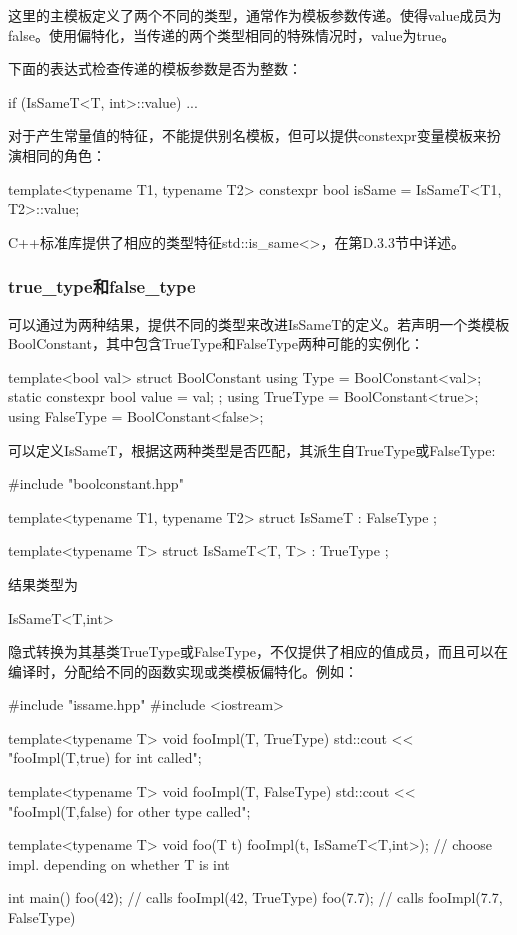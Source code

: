 这里的主模板定义了两个不同的类型，通常作为模板参数传递。使得value成员为false。使用偏特化，当传递的两个类型相同的特殊情况时，value为true。

下面的表达式检查传递的模板参数是否为整数：

\begin{cpp}
if (IsSameT<T, int>::value) ...
\end{cpp}

对于产生常量值的特征，不能提供别名模板，但可以提供constexpr变量模板来扮演相同的角色：

\begin{cpp}
template<typename T1, typename T2>
constexpr bool isSame = IsSameT<T1, T2>::value;
\end{cpp}

C++标准库提供了相应的类型特征std::is\_same<>，在第D.3.3节中详述。

\subsubsection{true\_type和false\_type}

可以通过为两种结果，提供不同的类型来改进IsSameT的定义。若声明一个类模板BoolConstant，其中包含TrueType和FalseType两种可能的实例化：

\begin{cpp}
template<bool val>
struct BoolConstant {
	using Type = BoolConstant<val>;
	static constexpr bool value = val;
};
using TrueType = BoolConstant<true>;
using FalseType = BoolConstant<false>;
\end{cpp}

可以定义IsSameT，根据这两种类型是否匹配，其派生自TrueType或FalseType:

\begin{cpp}
#include "boolconstant.hpp"

template<typename T1, typename T2>
struct IsSameT : FalseType
{
};

template<typename T>
struct IsSameT<T, T> : TrueType
{
};
\end{cpp}

结果类型为

\begin{cpp}
IsSameT<T,int>
\end{cpp}

隐式转换为其基类TrueType或FalseType，不仅提供了相应的值成员，而且可以在编译时，分配给不同的函数实现或类模板偏特化。例如：

\begin{cpp}
#include "issame.hpp"
#include <iostream>

template<typename T>
void fooImpl(T, TrueType)
{
	std::cout << "fooImpl(T,true) for int called\n";
}

template<typename T>
void fooImpl(T, FalseType)
{
	std::cout << "fooImpl(T,false) for other type called\n";
}

template<typename T>
void foo(T t)
{
	fooImpl(t, IsSameT<T,int>{}); // choose impl. depending on whether T is int
}

int main()
{
	foo(42); // calls fooImpl(42, TrueType)
	foo(7.7); // calls fooImpl(7.7, FalseType)
}
\end{cpp}

